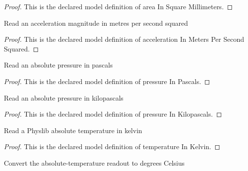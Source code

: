 \begin{proof}
  This is the declared model definition of area In Square Millimeters.
\end{proof}
\begin{definition}
  \label{def:physics:phyx-mini-0398:phyxminiproblems-problemphyxmini0398-accelerationinmeterspersecondsquared}
  Read an acceleration magnitude in metres per second squared
\end{definition}
\begin{proof}
  This is the declared model definition of acceleration In Meters Per Second Squared.
\end{proof}
\begin{definition}
  \label{def:physics:phyx-mini-0398:phyxminiproblems-problemphyxmini0398-pressureinpascals}
  Read an absolute pressure in pascals
\end{definition}
\begin{proof}
  This is the declared model definition of pressure In Pascals.
\end{proof}
\begin{definition}
  \label{def:physics:phyx-mini-0398:phyxminiproblems-problemphyxmini0398-pressureinkilopascals}
  Read an absolute pressure in kilopascals
\end{definition}
\begin{proof}
  This is the declared model definition of pressure In Kilopascals.
\end{proof}
\begin{definition}
  \label{def:physics:phyx-mini-0398:phyxminiproblems-problemphyxmini0398-temperatureinkelvin}
  Read a Physlib absolute temperature in kelvin
\end{definition}
\begin{proof}
  This is the declared model definition of temperature In Kelvin.
\end{proof}
\begin{definition}
  \label{def:physics:phyx-mini-0398:phyxminiproblems-problemphyxmini0398-temperatureindegreescelsius}
  Convert the absolute-temperature readout to degrees Celsius
\end{definition}

